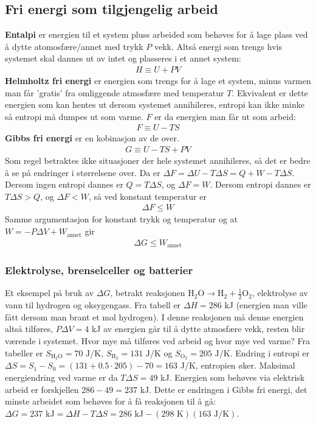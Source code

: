 \documentclass[12pt]{article}
\begin{document}
\subsection{Fri energi som tilgjengelig arbeid}
\textbf{Entalpi} er energien til et system pluss arbeided som behøves for å lage plass ved å dytte
atomosfære/annet med trykk $P$ vekk. Altså energi som trengs hvis systemet
skal dannes ut av intet og plasseres i et annet system:
\begin{align*}
  H \equiv U + PV
\end{align*}
\textbf{Helmholtz fri energi} er energien som trengs for å lage et system, minus
varmen man får 'gratis' fra omliggende atmosfære med temperatur $T$. Ekvivalent er
dette energien som kan hentes ut dersom systemet annihileres, entropi kan ikke minke
så entropi må dumpes ut som varme. $F$ er da energien man får ut som arbeid:
\begin{align*}
  F \equiv U - TS
\end{align*}
\textbf{Gibbs fri energi} er en kobinasjon av de over.
\begin{align*}
  G \equiv U - TS + PV
\end{align*}
Som regel betraktes ikke situasjoner der hele systemet annihileres, så det er
bedre å se på endringer i størrelsene over. Da er $\Delta F = \Delta U - T \Delta S = Q + W - T \Delta S$.
Dersom ingen entropi dannes er $Q = T\Delta S$, og $\Delta F = W$. Dersom entropi
dannes er $T\Delta S > Q$, og $\Delta F < W$, så ved konstant temperatur er
\begin{align*}
  \Delta F \leq W
\end{align*}
Samme argumentasjon for konstant trykk og temperatur og at $W = -P\Delta V + W_\text{annet}$
gir
\begin{align*}
  \Delta G \leq W_\text{annet}
\end{align*}
\subsubsection{Elektrolyse, brenselceller og batterier}
Et eksempel på bruk av $\Delta G$, betrakt reaksjonen $\text{H}_2 \text{O} \rightarrow \text{H}_2 + \frac{1}{2}\text{O}_2$,
elektrolyse av vann til hydrogen og oksygengass. Fra tabell er $\Delta H = 286$ kJ (energien man ville fått dersom man brant et mol hydrogen).
I denne reaksjonen må denne energien altså tilføres, $P\Delta V = 4$ kJ av energien går til å dytte atmosfære vekk, resten blir værende i systemet.
Hvor mye må tilføres ved arbeid og hvor mye ved varme? Fra tabeller er $S_{\text{H}_2 \text{O}} = 70 \text{ J/K}$, $S_{\text{H}_2} = 131 \text{ J/K}$
og $S_{\text{O}_2} = 205 \text{ J/K}$. Endring i entropi er $\Delta S = S_1 - S_0 = (131 + 0.5 \cdot 205) - 70 = 163$ J/K, entropien øker. Maksimal
energiendring ved varme er da $T\Delta S = 49$ kJ. Energien som behøves via elektrisk arbeid
er forskjellen $286 - 49 = 237$ kJ. Dette er endringen i Gibbs fri energi, det minste arbeidet som behøves for
å få reaksjonen til å gå: $\Delta G = 237 \text{ kJ} = \Delta H - T \Delta S = 286 \text{ kJ} - (298 \text{ K})(163 \text{ J/K})$.
\end{document}
